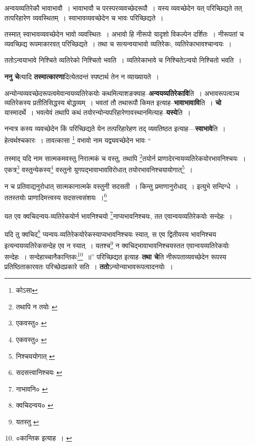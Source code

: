 \documentclass[article,12pt,a4paper]{memoir}
\begin{document}
	  \pstart अन्वयव्यतिरेकौ भावाभावौ । भावाभावौ च परस्परव्यवच्छेदरूपौ । यस्य व्यवच्छेदेन यत् परिच्छिद्यते तत् तत्परिहारेण व्यवस्थितम् । स्वाभावव्यवच्छेदेन च भावः परिच्छिद्यते ।
	\pend
       

	  \pstart तस्मात् स्वाभावव्यवच्छेदेन भावो व्यवस्थितः । अभावो हि नीरूपो यादृशो विकल्पेन दर्शितः । नीरूपतां च व्यवच्छिद्य रूपमाकारवत् परिच्छिद्यते । तथा च सत्यन्वयाभावो व्यतिरेकः, व्यतिरेकाभावश्चान्वयः ।
	\pend
       

	  \pstart ततोऽन्वयाभावे निश्चिते व्यतिरेको निश्चितो भवति । व्यतिरेकाभावे च निश्चितेऽन्वयो निश्चितो भवति ।
	\pend
      
	  \endgroup
	

	  \pstart \textbf{ननु चे}त्यादि \textbf{तस्मात्कारणा}दित्येतदन्तं स्पष्टार्थ तेन न व्याख्यायते ।
	\pend
      

	  \pstart अन्योन्यव्यवच्छेदरूपत्वमेवान्वयव्यतिरेकयोः कथमित्याशङक्याह--\textbf{अन्वयव्यतिरेकावि}ति । अभावरूपत्वञ्च व्यतिरेकस्य प्रतीतिसिद्धस्य बोद्धव्यम् । भवतां तौ तथारूपौ किमत इत्याह--\textbf{भावाभावावि}ति । \textbf{चो} यास्मादर्थे । भवत्वेवं तथापि कथं तयोरन्योन्यपरिहारेणावस्थानमित्याह--\textbf{यस्ये}ति ।
	\pend
      

	  \pstart नन्वत्र कस्य व्यवच्छेदेन किं परिच्छिद्यते येन तत्परिहारेहण तद् व्यवतिष्ठत इत्याह—\textbf{स्वाभावे}ति । हेत्वर्थश्चकारः । तावत्कासा \footnote{कोऽसा} वभावो नाम यद्व्यवच्छेदेन भावः  \leavevmode{} “
	  
	तस्माद् यदि नाम सात्मकमवस्तु निरात्मकं च वस्तु, तथापि \footnote{तथापि न तयोः \cite{dp-msA} \cite{dp-msB} \cite{dp-edP} \cite{dp-edH} \cite{dp-edE} \cite{dp-edN}}तयोर्न प्राणादेरन्वयव्यतिरेकयोरभावनिश्चयः । एकत्र\footnote{एकवस्तु० \cite{dp-msA} \cite{dp-msB} \cite{dp-edP} \cite{dp-edH} \cite{dp-edE} \cite{dp-edN}} वस्तुन्येकस्य\footnote{एकवस्तु० \cite{dp-msA} \cite{dp-msB} \cite{dp-edP} \cite{dp-edH} \cite{dp-edE} \cite{dp-edN}} वस्तुनो युगपद्भावाभावविरोधात् तयोरभावनिश्चयायोगात्\footnote{निश्चययोगात् \cite{dp-msB}} । 
	  
	न च प्रतिवाद्यनुरोधात् सात्मकानात्मके वस्तुनी सदसती । किन्तु प्रमाणानुरोधाद् । इत्युभे सन्दिग्धे । ततस्तयोः प्राणादिमत्त्वस्य सदसत्त्वसंशयः ।\footnote{सदसत्त्वानिश्चयः \cite{dp-msC}} 
	  
	यत एव क्वचिदन्वय-व्यतिरेकयोर्न भावनिश्चयो \footnote{नाभावनि० \cite{dp-msC}}नाप्यभावनिश्चयः, तत एवान्वयव्यतिरेकयोः सन्देहः । 
	  
	यदि तु क्वचिद\footnote{क्वचिदन्वय० \cite{dp-msC} \cite{dp-msD}} प्यन्वय-व्यतिरेकयोरेकस्याप्यभावनिश्चयः स्यात्, स एव द्वितीयस्य भावनिश्चय इत्यन्वयव्यतिरेकसन्देह एव न स्यात् । यतश्च\footnote{यतस्तु \cite{dp-msC} \cite{dp-msD}} न क्वचिद्भावाभावनिश्चयस्तत एवान्वयव्यतिरेकयोः सन्देहः । सन्देहाच्चानैकान्तिकः\footnote{०कान्तिक इत्याह । \cite{dp-edE}} ॥” परिच्छिद्यत इत्याह--\textbf{तथा चे}ति नीरूपताव्यवच्छेदेन रूपस्य प्रतिष्ठिताकारवतः परिच्छेदप्रकारे सति । \textbf{ततो}ऽन्योन्याभावरूपत्वादनयोः ।
	\pend
      
\end{document}

